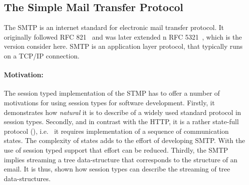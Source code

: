 \subsection{The Simple Mail Transfer Protocol}

The SMTP is an internet standard for electronic
mail transfer protocol. It originally followed 
RFC 821~\cite{SMTP-rfc} and was later extended 
n RFC 5321~\cite{ESMTP-rfc}, which is the version consider here.
SMTP is an application layer protocol, that typically runs on
a TCP/IP connection.

\paragraph{Motivation:}
The session typed implementation of the STMP has to offer
a number of motivations for using session types for software
development.
Firstly, it demonstrates how {\em natural} it is
to describe of a widely used standard protocol in session types.
Secondly, and in contrast with the HTTP, it is
a rather state-full protocol (),
i.e.~ it requires implementation of a sequence of communication states.
The complexity of states adds to the effort of 
developing SMTP. With the use of session typed
support that effort can be reduced.
Thirdly, the SMTP implies streaming a tree
data-structure that corresponds to the structure
of an email.
It is thus, shown how session types can describe
the streaming of tree data-structures.


%
%

